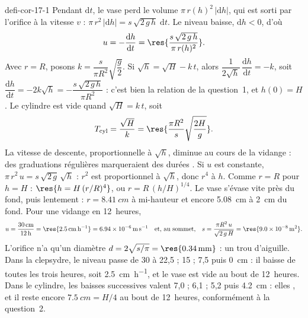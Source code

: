 \begin{blocEdition}{defi-cor-17-1}
Pendant $\mathrm{d}t$, le vase perd le volume $\pi\,r(h)^2\,|\mathrm{d}h|$, qui est sorti par l'orifice à la vitesse $v$ :
$\pi\,r^2\,|\mathrm{d}h|=s\,\sqrt{2\,g\,h}\;\mathrm{d}t$. Le niveau baisse, $\mathrm{d}h<0$, d'où
\[u=-\frac{\mathrm{d}h}{\mathrm{d}t}=\res{\frac{s\,\sqrt{2\,g\,h}}{\pi\,r(h)^2}}.\]
Avec $r=R$, posons $k=\dfrac{s}{\pi R^2}\sqrt{\dfrac{g}{2}}$. Si $\sqrt{h}=\sqrt{H}-k\,t$, alors
$\dfrac{1}{2\sqrt{h}}\,\dfrac{\mathrm{d}h}{\mathrm{d}t}=-k$, soit $\dfrac{\mathrm{d}h}{\mathrm{d}t}=-2k\sqrt{h}=-\dfrac{s\,\sqrt{2\,g\,h}}{\pi R^2}$ :
c'est bien la relation de la question~1, et $h(0)=H$. Le cylindre est vide quand $\sqrt{H}=k\,t$, soit
\[T_\mathrm{cyl}=\frac{\sqrt{H}}{k}=\res{\frac{\pi R^2}{s}\sqrt{\frac{2H}{g}}}.\]
La vitesse de descente, proportionnelle à $\sqrt{h}$, diminue au cours de la vidange : des graduations régulières
marqueraient des durées .
Si $u$ est constante, $\pi\,r^2\,u=s\,\sqrt{2\,g}\,\sqrt{h}$ : $r^2$ est proportionnel à $\sqrt{h}$, donc $r^4$ à $h$. Comme $r=R$
pour $h=H$ : $\res{h=H\,(r/R)^4}$, ou $r=R\,(h/H)^{1/4}$. Le vase s'évase vite près du fond, puis lentement : $r=\qty{8,41}{cm}$
à mi-hauteur et encore \qty{5,08}{cm} à \qty{2}{cm} du fond. Pour une vidange en 12~heures,
\[u=\frac{\qty{30}{cm}}{\qty{12}{h}}=\res{\qty{2,5}{cm.h^{-1}}}=\qty{6,94e-6}{m.s^{-1}}\quad\text{et, au sommet,}\quad
s=\frac{\pi R^2\,u}{\sqrt{2\,g\,H}}=\res{\qty{9,0e-8}{m^2}}.\]
L'orifice n'a qu'un diamètre $d=2\sqrt{s/\pi}=\res{\qty{0,34}{mm}}$ : un trou d'aiguille.
Dans la clepsydre, le niveau passe de 30 à 22,5 ; 15 ; 7,5 puis \qty{0}{cm} : il baisse de  toutes les trois
heures, soit \qty{2,5}{cm.h^{-1}}, et le vase est vide au bout de 12~heures. Dans le cylindre, les baisses successives
valent 7,0 ; 6,1 ; 5,2 puis \qty{4,2}{cm} : elles , et il reste encore $\qty{7,5}{cm}=H/4$ au bout de
12~heures, conformément à la question~2.
\end{blocEdition}

